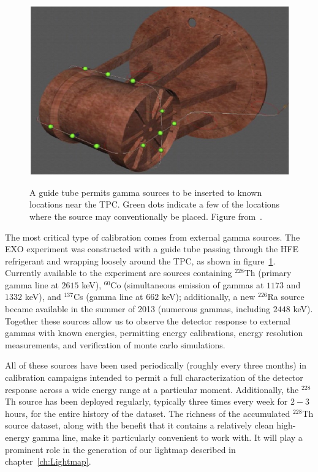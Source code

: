 \begin{figure}
\begin{center}
\includegraphics[keepaspectratio=true,width=\textwidth]{calibration_tube.jpg}
\end{center}
\renewcommand{\baselinestretch}{1}
\small\normalsize
\begin{quote}
\caption{A guide tube permits gamma sources to be inserted to known locations near the TPC.  Green dots indicate a few of the locations where the source may conventionally be placed.  Figure from~\cite{detectorPartI}.}
\label{fig:CalibrationGuideTube}
\end{quote}
\end{figure}
\renewcommand{\baselinestretch}{2}
\small\normalsize

The most critical type of calibration comes from external gamma sources.  The EXO experiment was constructed with a guide tube passing through the HFE refrigerant and wrapping loosely around the TPC, as shown in figure~\ref{fig:CalibrationGuideTube}.  Currently available to the experiment are sources containing $^{228}$Th (primary gamma line at $2615$ keV), $^{60}$Co (simultaneous emission of gammas at $1173$ and $1332$ keV), and $^{137}$Cs (gamma line at $662$ keV); additionally, a new $^{226}$Ra source became available in the summer of 2013 (numerous gammas, including $2448$ keV).  Together these sources allow us to observe the detector response to external gammas with known energies, permitting energy calibrations, energy resolution measurements, and verification of monte carlo simulations.

All of these sources have been used periodically (roughly every three months) in calibration campaigns intended to permit a full characterization of the detector response across a wide energy range at a particular moment.  Additionally, the $^{228}$Th source has been deployed regularly, typically three times every week for $2-3$ hours, for the entire history of the dataset.  The richness of the accumulated $^{228}$Th source dataset, along with the benefit that it contains a relatively clean high-energy gamma line, make it particularly convenient to work with. It will play a prominent role in the generation of our lightmap described in chapter~\ref{ch:Lightmap}.

